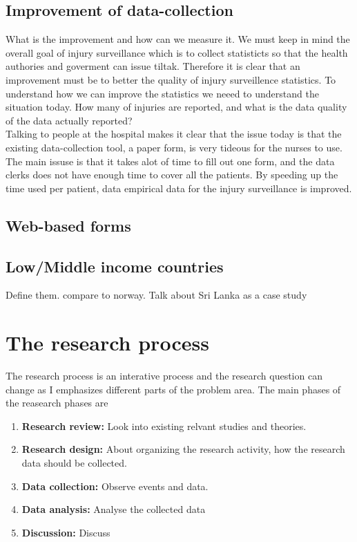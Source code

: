 \documentclass[UKenglish, 12pt]{article}
\begin{document}
\subsection*{Improvement of data-collection} 
What is the improvement and how can  we measure it. We must keep in mind the overall goal of injury surveillance which is to collect statisticts so that the health authories and goverment can issue tiltak. Therefore it is clear that an improvement must be to better the quality of injury surveillence statistics. To understand how we can improve the statistics we neeed to understand the situation today. How many of injuries are reported, and what is the data quality of the data actually reported? \\
Talking to people at the hospital makes it clear that the issue today is that the existing data-collection tool, a paper form, is very tideous for the nurses to use. The main issuse is that it takes alot of time to fill out one form, and the data clerks does not have enough time to cover all the patients. By speeding up the time used per patient, data empirical data for the injury surveillance is improved.

\subsection*{Web-based forms}

\subsection*{Low/Middle income countries}
Define them. compare to norway. Talk about Sri Lanka as a case study
 

 \section*{The research process}
 The research process is an interative process and the research question can change as I emphasizes different parts of the problem area. The main phases of the reasearch phases are
 \begin{enumerate}
 \item \textbf{Research review:} Look into existing relvant studies and theories.
 \item \textbf{Research design:} About organizing the research activity, how the research data should be collected.
 \item \textbf{Data collection:} Observe events and data.
 \item \textbf{Data analysis:} Analyse the collected data
 \item \textbf{Discussion:} Discuss

 \end{enumerate}
\end{document}
